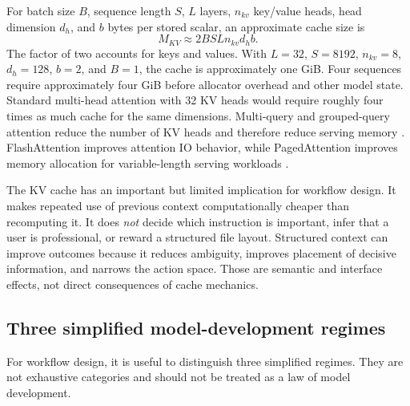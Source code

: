 \documentclass[11pt,a4paper]{article}
\begin{document}
For batch size $B$, sequence length $S$, $L$ layers, $n_{kv}$ key/value heads, head dimension $d_h$, and $b$ bytes per stored scalar, an approximate cache size is
\begin{equation}
M_{KV}\approx 2BSLn_{kv}d_hb.
\end{equation}
The factor of two accounts for keys and values. With $L=32$, $S=8192$, $n_{kv}=8$, $d_h=128$, $b=2$, and $B=1$, the cache is approximately one GiB. Four sequences require approximately four GiB before allocator overhead and other model state. Standard multi-head attention with 32 KV heads would require roughly four times as much cache for the same dimensions. Multi-query and grouped-query attention reduce the number of KV heads and therefore reduce serving memory \cite{shazeer2019,ainslie2023}. FlashAttention improves attention IO behavior, while PagedAttention improves memory allocation for variable-length serving workloads \cite{dao2022,kwon2023}.

The KV cache has an important but limited implication for workflow design. It makes repeated use of previous context computationally cheaper than recomputing it. It does \emph{not} decide which instruction is important, infer that a user is professional, or reward a structured file layout. Structured context can improve outcomes because it reduces ambiguity, improves placement of decisive information, and narrows the action space. Those are semantic and interface effects, not direct consequences of cache mechanics.

\subsection{Three simplified model-development regimes}\label{sec:model-regimes}

For workflow design, it is useful to distinguish three simplified regimes. They are not exhaustive categories and should not be treated as a law of model development.
\end{document}
